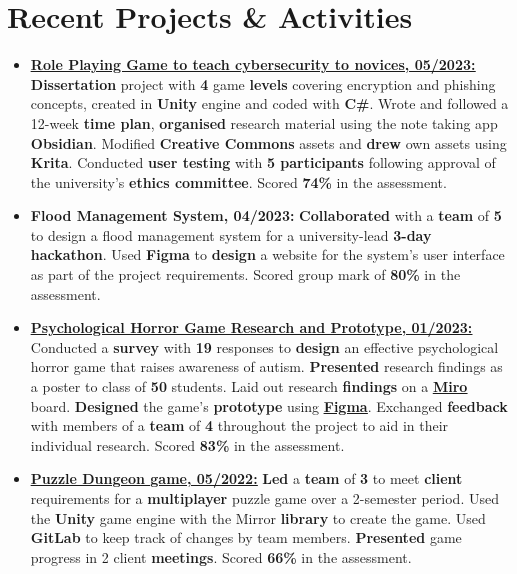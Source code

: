 \documentclass[11pt]{article}
\newcommand{\ulink}[2]{\href{#1}{\uline{#2}}}
\begin{document}
    \section{Recent Projects \& Activities}
    \begin{itemize}[itemsep=0pt, leftmargin=1em]
        \item \ulink{https://orbit-9j.github.io/Portfolio/\#/Cyberscape:\%20a\%20Cybersecurity\%20RPG}{\textbf{Role Playing Game to teach cybersecurity to novices, 05/2023:}} \textbf{Dissertation} project with \textbf{4} game \textbf{levels} covering encryption and phishing concepts, created in \textbf{Unity} engine and coded with \textbf{C\#}. Wrote and followed a 12-week \textbf{time plan}, \textbf{organised} research material using the note taking app \textbf{Obsidian}. Modified \textbf{Creative Commons} assets and \textbf{drew} own assets using \textbf{Krita}. Conducted \textbf{user testing} with \textbf{5 participants} following approval of the university's \textbf{ethics committee}. Scored \textbf{74\%} in the assessment.
        \item \textbf{Flood Management System, 04/2023:} \textbf{Collaborated} with a \textbf{team} of \textbf{5} to design a flood management system for a university-lead \textbf{3-day} \textbf{hackathon}. Used \textbf{Figma} to \textbf{design} a website for the system's user interface as part of the project requirements. Scored group mark of \textbf{80\%} in the assessment.
        \item \ulink{https://orbit-9j.github.io/Portfolio/\#/Psychodyssey}{\textbf{Psychological Horror Game Research and Prototype, 01/2023:}} Conducted a \textbf{survey} with \textbf{19} responses to \textbf{design} an effective psychological horror game that raises awareness of autism. \textbf{Presented} research findings as a poster to class of \textbf{50} students. Laid out research \textbf{findings} on a \textbf{\ulink{https://miro.com/app/board/uXjVPMzhjBo=/?share_link_id=722803847643}{Miro}} board. \textbf{Designed} the game's \textbf{prototype} using \textbf{\ulink{https://www.figma.com/file/pyHXkKKN4cn5MtXx4WpAHR/design-cw?t=gjgzJrZM4Dd0YaZP-1}{Figma}}.  Exchanged \textbf{feedback} with members of a \textbf{team} of \textbf{4} throughout the project to aid in their individual research. Scored \textbf{83\%} in the assessment.
        \item \ulink{https://orbit-9j.github.io/Portfolio/\#/Puzzle\%20Dungeon:\%20a\%20Multiplayer\%20Puzzle\%20Game}{\textbf{Puzzle Dungeon game, 05/2022:}} \textbf{Led} a \textbf{team} of \textbf{3} to meet \textbf{client} requirements for a \textbf{multiplayer} puzzle game over a 2-semester period. Used the \textbf{Unity} game engine with the Mirror \textbf{library} to create the game. Used \textbf{GitLab} to keep track of changes by team members. \textbf{Presented} game progress in 2 client \textbf{meetings}. Scored \textbf{66\%} in the assessment.

\end{itemize}
\end{document}
